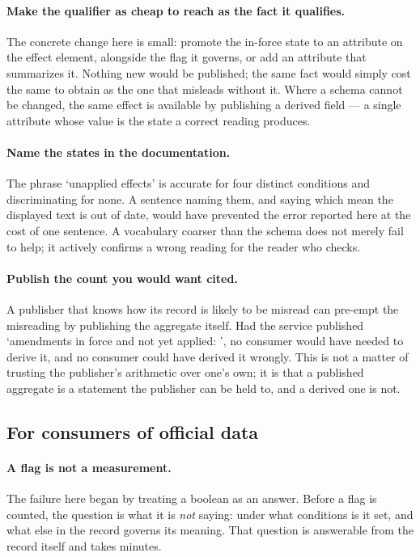 \documentclass[11pt]{article}
\begin{document}
\paragraph{Make the qualifier as cheap to reach as the fact it qualifies.} The
concrete change here is small: promote the in-force state to an attribute on
the effect element, alongside the flag it governs, or add an attribute that
summarizes it. Nothing new would be published; the same fact would simply cost
the same to obtain as the one that misleads without it. Where a schema cannot
be changed, the same effect is available by publishing a derived field --- a
single attribute whose value is the state a correct reading produces.

\paragraph{Name the states in the documentation.} The phrase `unapplied
effects' is accurate for four distinct conditions and discriminating for none.
A sentence naming them, and saying which mean the displayed text is out of
date, would have prevented the error reported here at the cost of one sentence.
A vocabulary coarser than the schema does not merely fail to help; it actively
confirms a wrong reading for the reader who checks.

\paragraph{Publish the count you would want cited.} A publisher that knows how
its record is likely to be misread can pre-empt the misreading by publishing
the aggregate itself. Had the service published `amendments in force and not
yet applied: \nInForceNow{}', no consumer would have needed to derive it, and
no consumer could have derived it wrongly. This is not a matter of trusting the
publisher's arithmetic over one's own; it is that a published aggregate is a
statement the publisher can be held to, and a derived one is not.

\subsection{For consumers of official data}

\paragraph{A flag is not a measurement.} The failure here began by treating a
boolean as an answer. Before a flag is counted, the question is what it is
\emph{not} saying: under what conditions is it set, and what else in the record
governs its meaning. That question is answerable from the record itself and
takes minutes.
\end{document}
